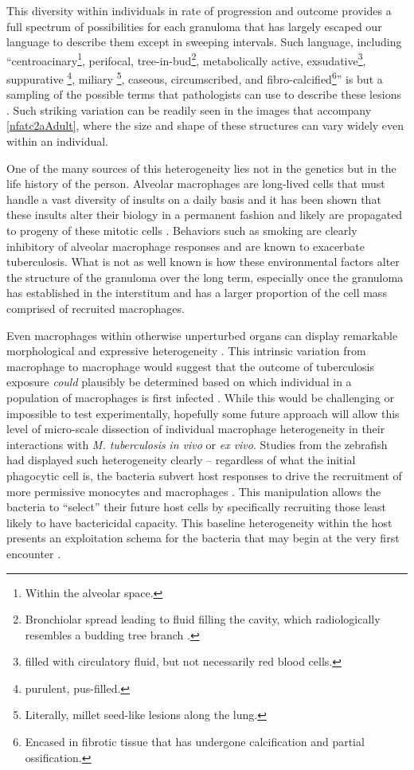 This diversity within individuals in rate of progression and outcome provides a full spectrum of possibilities for each granuloma that has largely escaped our language to describe them except in sweeping intervals. Such language, including ``centroacinary\footnote{Within the alveolar space.}, perifocal, tree\hyp{}in\hyp{}bud\footnote{Bronchiolar spread leading to fluid filling the cavity, which radiologically resembles a budding tree branch \citep{Gosset2009}.}, metabolically active, exsudative\footnote{filled with circulatory fluid, but not necessarily red blood cells.}, suppurative \footnote{purulent, pus-filled.}, miliary \footnote{Literally, millet seed-like lesions along the lung.}, caseous, circumscribed, and fibro\hyp{}calcified\footnote{Encased in fibrotic tissue that has undergone calcification and partial ossification.}'' is but a sampling of the possible terms that pathologists can use to describe these lesions \citep{Ehlers2012}. Such striking variation can be readily seen in the images that accompany \autoref{nfatc2aAdult}, where the size and shape of these structures can vary widely even within an individual.

One of the many sources of this heterogeneity lies not in the genetics but in the life history of the person. Alveolar macrophages are long\hyp{}lived cells that must handle a vast diversity of insults on a daily basis and it has been shown that these insults alter their biology in a permanent fashion and likely are propagated to progeny of these mitotic cells \citep{Gonzalez2017, Duan2017, Berg2016, Glickman2016, Woodruff2005, Hodge2007}. Behaviors such as smoking are clearly inhibitory of alveolar macrophage responses and are known to exacerbate tuberculosis. What is not as well known is how these environmental factors alter the structure of the granuloma over the long term, especially once the granuloma has established in the interstitum and has a larger proportion of the cell mass comprised of recruited macrophages.

Even macrophages within otherwise unperturbed organs can display remarkable morphological and expressive heterogeneity \citep{Gordon2017, Gordon2005a}. This intrinsic variation from macrophage to macrophage would suggest that the outcome of tuberculosis exposure \textit{could} plausibly be determined based on which individual in a population of macrophages is first infected \citep{Verrall2014}. While this would be challenging or impossible to test experimentally, hopefully some future approach will allow this level of micro\hyp{}scale dissection of individual macrophage heterogeneity in their interactions with \textit{M. tuberculosis} \textit{in vivo} or \textit{ex vivo}. Studies from the zebrafish had displayed such heterogeneity clearly -- regardless of what the initial phagocytic cell is, the bacteria subvert host responses to drive the recruitment of more permissive monocytes and macrophages \citep{Cambier2014b}. This manipulation allows the bacteria to ``select'' their future host cells by specifically recruiting those least likely to have bactericidal capacity. This baseline heterogeneity within the host presents an exploitation schema for the bacteria that may begin at the very first encounter \citep{Ramakrishnan2013b}.

